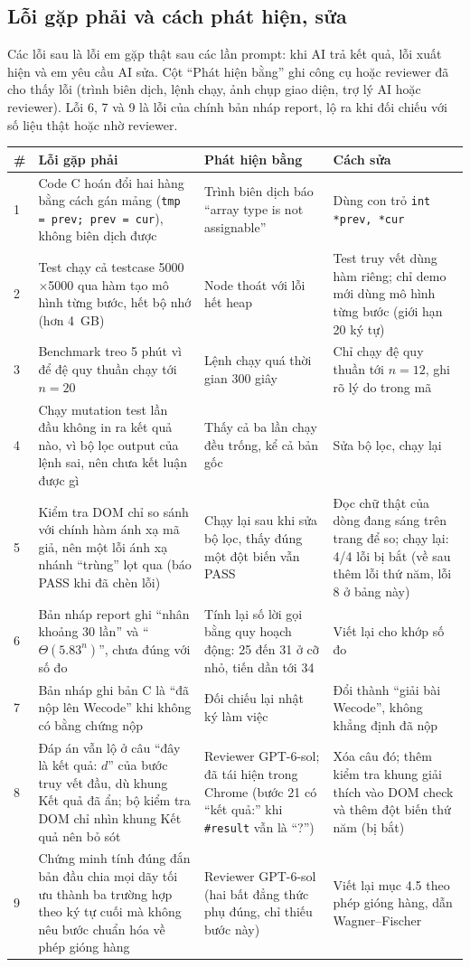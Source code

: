 \documentclass[12pt,a4paper]{article}
\newcommand{\code}[1]{\texttt{#1}}
\begin{document}
\subsection{Lỗi gặp phải và cách phát hiện, sửa}
Các lỗi sau là lỗi em gặp thật sau các lần prompt: khi AI trả kết quả, lỗi xuất hiện và em yêu cầu AI sửa. Cột ``Phát hiện bằng'' ghi công cụ hoặc reviewer đã cho thấy lỗi (trình biên dịch, lệnh chạy, ảnh chụp giao diện, trợ lý AI hoặc reviewer). Lỗi 6, 7 và 9 là lỗi của chính bản nháp report, lộ ra khi đối chiếu với số liệu thật hoặc nhờ reviewer.
{\small
\begin{longtable}{@{}p{0.4cm}p{5.1cm}p{4.2cm}p{4.3cm}@{}}
\toprule
\# & Lỗi gặp phải & Phát hiện bằng & Cách sửa\\
\midrule
\endhead
1 & Code C hoán đổi hai hàng bằng cách gán mảng (\code{tmp = prev; prev = cur}), không biên dịch được & Trình biên dịch báo ``array type is not assignable'' & Dùng con trỏ \code{int *prev, *cur}\\
2 & Test chạy cả testcase 5000$\times$5000 qua hàm tạo mô hình từng bước, hết bộ nhớ (hơn 4~GB) & Node thoát với lỗi hết heap & Test truy vết dùng hàm riêng; chỉ demo mới dùng mô hình từng bước (giới hạn 20 ký tự)\\
3 & Benchmark treo 5 phút vì để đệ quy thuần chạy tới $n=20$ & Lệnh chạy quá thời gian 300 giây & Chỉ chạy đệ quy thuần tới $n=12$, ghi rõ lý do trong mã\\
4 & Chạy mutation test lần đầu không in ra kết quả nào, vì bộ lọc output của lệnh sai, nên chưa kết luận được gì & Thấy cả ba lần chạy đều trống, kể cả bản gốc & Sửa bộ lọc, chạy lại\\
5 & Kiểm tra DOM chỉ so sánh với chính hàm ánh xạ mã giả, nên một lỗi ánh xạ nhánh ``trùng'' lọt qua (báo PASS khi đã chèn lỗi) & Chạy lại sau khi sửa bộ lọc, thấy đúng một đột biến vẫn PASS & Đọc chữ thật của dòng đang sáng trên trang để so; chạy lại: 4/4 lỗi bị bắt (về sau thêm lỗi thứ năm, lỗi 8 ở bảng này)\\
6 & Bản nháp report ghi ``nhân khoảng 30 lần'' và ``$\Theta(5.83^n)$'', chưa đúng với số đo & Tính lại số lời gọi bằng quy hoạch động: 25 đến 31 ở cỡ nhỏ, tiến dần tới 34 & Viết lại cho khớp số đo\\
7 & Bản nháp ghi bản C là ``đã nộp lên Wecode'' khi không có bằng chứng nộp & Đối chiếu lại nhật ký làm việc & Đổi thành ``giải bài Wecode'', không khẳng định đã nộp\\
8 & Đáp án vẫn lộ ở câu ``đây là kết quả: $d$'' của bước truy vết đầu, dù khung Kết quả đã ẩn; bộ kiểm tra DOM chỉ nhìn khung Kết quả nên bỏ sót & Reviewer GPT-6-sol; đã tái hiện trong Chrome (bước 21 có ``kết quả:'' khi \code{\#result} vẫn là ``?'') & Xóa câu đó; thêm kiểm tra khung giải thích vào DOM check và thêm đột biến thứ năm (bị bắt)\\
9 & Chứng minh tính đúng đắn bản đầu chia mọi dãy tối ưu thành ba trường hợp theo ký tự cuối mà không nêu bước chuẩn hóa về phép gióng hàng & Reviewer GPT-6-sol (hai bất đẳng thức phụ đúng, chỉ thiếu bước này) & Viết lại mục 4.5 theo phép gióng hàng, dẫn Wagner--Fischer\\
\bottomrule
\end{longtable}
}
\end{document}
